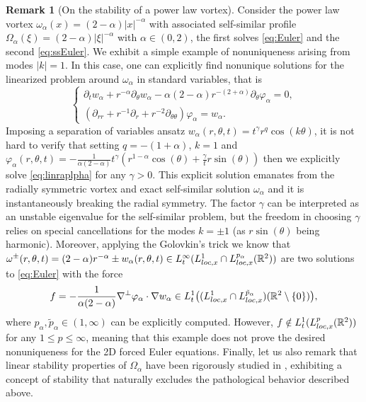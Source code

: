 \documentclass[11pt,reqno]{amsproc}
\def\de{{\partial}}
\def\RR {\mathbb{R}}
\theoremstyle{definition}
\newtheorem{remark}[proposition]{Remark}
\theoremstyle{definition}
\numberwithin{equation}{section}
\begin{document}
\begin{remark}[On the stability of a power law vortex]
\label{rem:ralpha}
Consider the power law vortex $\omega_\alpha(x)=(2-\alpha)|x|^{-\alpha}$ with associated self-similar profile $\Omega_\alpha(\xi)=(2-\alpha)|\xi|^{-\alpha}$ with $\alpha\in(0,2)$, the first solves \cref{eq:Euler} and the second \cref{eq:ssEuler}. We exhibit a simple example of nonuniqueness arising from modes $|k|=1$. In this case, one can explicitly find nonunique solutions for the linearized problem around $\omega_\alpha$ in standard variables, that is 
    \begin{equation}
\label{eq:linraplpha}\begin{cases}\de_t w_{\alpha}+r^{-\alpha}\de_\theta w_{\alpha}-\alpha(2-\alpha) r^{-(2+\alpha)}\de_\theta \varphi_{\alpha}=0,\\
       (\de_{rr}+r^{-1}\de_r+r^{-2}\de_{\theta\theta})\varphi_\alpha=w_\alpha.
        \end{cases}
    \end{equation}Imposing a separation of variables ansatz $w_\alpha(r,\theta,t)=t^\gamma r^q\cos(k\theta)$, it is not hard to verify that setting $q=-(1+\alpha)$, $k=1$ and $\varphi_\alpha(r,\theta,t)=-\frac{1}{\alpha(2-\alpha)} t^\gamma(r^{1-\alpha}\cos(\theta)+\frac{\gamma}{t} r\sin(\theta) )$ then we explicitly solve \cref{eq:linraplpha} for any $\gamma >0 $. This explicit solution emanates from the radially symmetric vortex and exact self-similar solution $\omega_\alpha$ and it is instantaneously breaking the radial symmetry. The factor $\gamma$ can be interpreted as an unstable  eigenvalue for the self-similar problem, but the freedom in choosing $\gamma$ relies on special cancellations for the modes $k=\pm1$ (as $r\sin(\theta)$ being harmonic). Moreover,  applying the Golovkin's trick we know that $\omega^\pm(r,\theta,t)=(2-\alpha)r^{-\alpha}\pm w_\alpha(r,\theta,t)\in L^\infty_t(L^1_{{\rm loc},x}\cap L^{p_\alpha}_{{\rm loc},x}(\RR^2))$ are two solutions to  \cref{eq:Euler} with the force
    \begin{equation}
        f=-\frac{1}{\alpha(2-\alpha)}\nabla^\perp \varphi_\alpha\cdot \nabla w_\alpha \in L^1_{t}\big((L^1_{{\rm loc},x}\cap L^{\tilde{p}_\alpha}_{{\rm loc},x})(\RR^2\setminus \{0\})\big),
    \end{equation}
    where $p_\alpha,\tilde{p}_\alpha\in (1,\infty)$ can be explicitly computed. 
However, $f\notin L^1_t(L^p_{{\rm loc},x}(\RR^2))$ for any $1\leq p\leq \infty$, meaning that this example does not prove the desired nonuniqueness for the 2D forced Euler equations.
Finally, let us also remark that linear stability properties of  $\Omega_\alpha$ have been rigorously studied in \cite{coiculescu2024stability}, exhibiting a concept of stability that naturally excludes the pathological behavior described above.
\end{remark}
\end{document}
